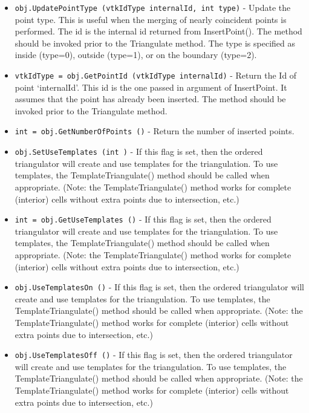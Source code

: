 \begin{itemize}
\item  \verb|obj.UpdatePointType (vtkIdType internalId, int type)| -  Update the point type. This is useful when the merging of nearly 
 coincident points is performed. The id is the internal id returned
 from InsertPoint(). The method should be invoked prior to the
 Triangulate method. The type is specified as inside (type=0), 
 outside (type=1), or on the boundary (type=2).
 

\item  \verb|vtkIdType = obj.GetPointId (vtkIdType internalId)| -  Return the Id of point `internalId'. This id is the one passed in
 argument of InsertPoint.
 It assumes that the point has already been inserted.
 The method should be invoked prior to the Triangulate method.
 

\item  \verb|int = obj.GetNumberOfPoints ()| -  Return the number of inserted points.

\item  \verb|obj.SetUseTemplates (int )| -  If this flag is set, then the ordered triangulator will create
 and use templates for the triangulation. To use templates, the
 TemplateTriangulate() method should be called when appropriate.
 (Note: the TemplateTriangulate() method works for complete 
 (interior) cells without extra points due to intersection, etc.)

\item  \verb|int = obj.GetUseTemplates ()| -  If this flag is set, then the ordered triangulator will create
 and use templates for the triangulation. To use templates, the
 TemplateTriangulate() method should be called when appropriate.
 (Note: the TemplateTriangulate() method works for complete 
 (interior) cells without extra points due to intersection, etc.)

\item  \verb|obj.UseTemplatesOn ()| -  If this flag is set, then the ordered triangulator will create
 and use templates for the triangulation. To use templates, the
 TemplateTriangulate() method should be called when appropriate.
 (Note: the TemplateTriangulate() method works for complete 
 (interior) cells without extra points due to intersection, etc.)

\item  \verb|obj.UseTemplatesOff ()| -  If this flag is set, then the ordered triangulator will create
 and use templates for the triangulation. To use templates, the
 TemplateTriangulate() method should be called when appropriate.
 (Note: the TemplateTriangulate() method works for complete 
 (interior) cells without extra points due to intersection, etc.)


\end{itemize}
